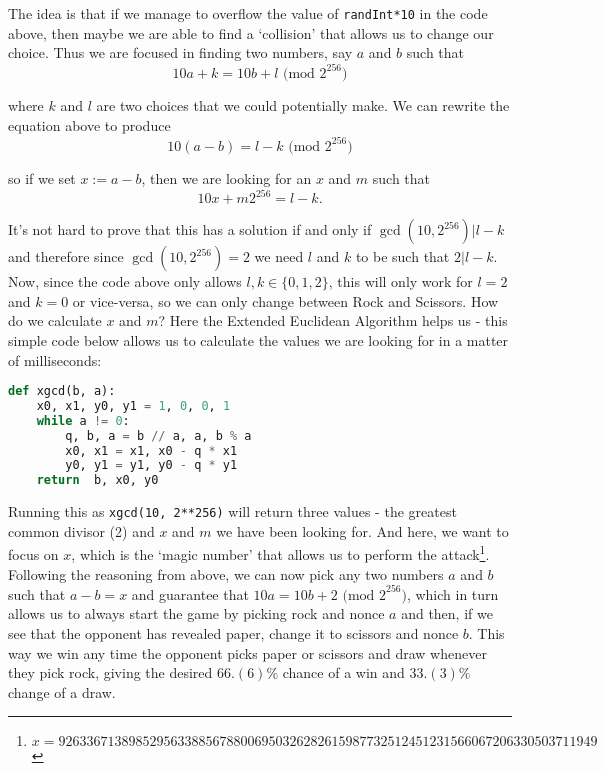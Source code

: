 \documentclass{article}
\begin{document}
    \noindent The idea is that if we manage to overflow the
    value of \verb|randInt*10| in the code above, then maybe
    we are able to find a `collision' that allows us to
    change our choice. Thus we are focused in finding two
    numbers, say \(a\) and \(b\) such that 
    \[
        10a + k = 10b + l \text{ (mod 2}^{256})
    \]

    \noindent where \(k\) and \(l\) are two choices that we could
    potentially make. We can rewrite the equation above to
    produce
    \[
        10(a-b) = l - k \text{ (mod 2}^{256})
    \]

    \noindent so if we set \(x := a - b\), then we are
    looking for an \(x\) and \(m\) such that
    \[
        10x + m2^{256} = l - k.
    \]

    \noindent It's not hard to prove that this has a
    solution if and only if \(\gcd(10, 2^{256}) | l - k\)
    and therefore since \(\gcd(10, 2^{256}) = 2\) we need
    \(l\) and \(k\) to be such that \(2 | l - k\). Now,
    since the code above only allows \(l,k \in \{0, 1,
    2\}\), this will only work for \(l = 2\) and \(k = 0\)
    or vice-versa, so we can only change between Rock and
    Scissors. How do we calculate \(x\) and \(m\)? Here the
    Extended Euclidean Algorithm helps us - this simple code
    below allows us to calculate the values we are looking
    for in a matter of milliseconds:

    \begin{lstlisting}[language=Python]
def xgcd(b, a):
    x0, x1, y0, y1 = 1, 0, 0, 1
    while a != 0:
        q, b, a = b // a, a, b % a
        x0, x1 = x1, x0 - q * x1
        y0, y1 = y1, y0 - q * y1
    return  b, x0, y0
    \end{lstlisting}

    \noindent Running this as \verb|xgcd(10, 2**256)| will
    return three values - the greatest common divisor (2)
    and \(x\) and \(m\) we have been looking for. And here,
    we want to focus on \(x\), which is the `magic number'
    that allows us to perform the
    attack\footnote{\(x=92633671389852956338856788006950326282615987732512451231566067206330503711949\)}.
    Following the reasoning from above, we can now pick any
    two numbers \(a\) and \(b\) such that \(a - b = x\) and
    guarantee that \(10a = 10b + 2 \text{ (mod 2}^{256})\),
    which in turn allows us to always start the game by
    picking rock and nonce \(a\) and then, if we see that
    the opponent has revealed paper, change it to scissors
    and nonce \(b\). This way we win any time the opponent
    picks paper or scissors and draw whenever they pick
    rock, giving the desired \(66.(6)\%\) chance of a win
    and \(33.(3)\%\) change of a draw.
    \newline
\end{document}
